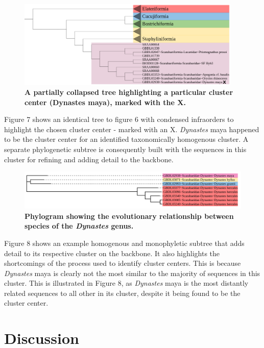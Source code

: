\documentclass[12pt]{article}
\begin{document}
  \begin{figure}[H]
    \centering
    \includegraphics[width=0.95\textwidth]{bbzoomfour.png}
    \captionsetup{margin=0.75cm}
      \caption{\textbf{\small A partially collapsed tree highlighting a particular cluster center (Dynastes maya), marked with the X.}}
  \end{figure}

  Figure 7 shows an identical tree to figure 6 with condensed infraorders to highlight the chosen cluster center - marked with an X. \textit{Dynastes} maya happened to be the cluster center for an identified taxonomically homogenous cluster. A separate phylogenetic subtree is consequently built with the sequences in this cluster for refining and adding detail to the backbone.   

  \begin{figure}[H]
    \centering
    \includegraphics[width=1\textwidth]{moeny.png}
    \captionsetup{margin=0.75cm}
      \caption{\textbf{\small Phylogram showing the evolutionary relationship between species of the \textit{Dynastes} genus.}}
  \end{figure}

  Figure 8 shows an example homogenous and monophyletic subtree that adds detail to its respective cluster on the backbone. It also highlights the shortcomings of the process used to identify cluster centers. This is because \textit{Dynastes} maya is clearly not the most similar to the majority of sequences in this cluster. This is illustrated in Figure 8, as \textit{Dynastes} maya is the most distantly related sequences to all other in its cluster, despite it being found to be the cluster center.

  \section{Discussion}
\end{document}
